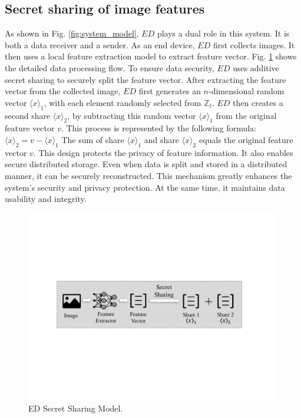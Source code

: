 \documentclass[conference]{IEEEtran}
\begin{document}
\subsection{Secret sharing of image features}

As shown in Fig. \ref{fig:system_model}, $ED$ plays a dual role in this system. It is both a data receiver and a sender. As an end device, $ED$ first collects images. It then uses a local feature extraction model to extract feature vector. Fig. \ref{fig:ED_Models} shows the detailed data processing flow. To ensure data security, $ED$ uses additive secret sharing to securely split the feature vector. After extracting the feature vector from the collected image, $ED$ first generates an $n$-dimensional random vector $\langle x \rangle_1$, with each element randomly selected from $\mathbb{Z}_t$. $ED$ then creates a second share $\langle x \rangle_2$, by subtracting this random vector $\langle x \rangle_1$ from the original feature vector $v$. This process is represented by the following formula:
$\langle x \rangle_2 = v - \langle x \rangle_1$
The sum of share $\langle x \rangle_1$ and share $\langle x \rangle_2$ equals the original feature vector $v$. This design protects the privacy of feature information. It also enables secure distributed storage. Even when data is split and stored in a distributed manner, it can be securely reconstructed. This mechanism greatly enhances the system's security and privacy protection. At the same time, it maintains data usability and integrity.

\begin{figure}[ht]
\includegraphics[width=1\linewidth]{fig2.pdf}
\caption{ED Secret Sharing Model.} \label{fig:ED_Models}
\end{figure}
\end{document}
